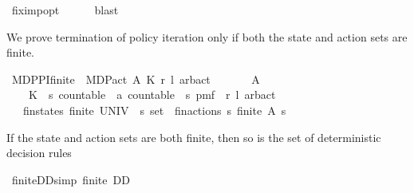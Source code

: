 \begin{isabellebody}
\ {\isasymL}{\isacharunderscore}{\kern0pt}fix{\isacharunderscore}{\kern0pt}imp{\isacharunderscore}{\kern0pt}opt\isanewline
\ \ \ \ \isamarkupfalse%
\ blast\isanewline
{}\isamarkupfalse%
%
\endisatagproof
{\isafoldproof}%
%
\isadelimproof
\isanewline
%
\endisadelimproof
\isanewline
{}\isamarkupfalse%
%
\begin{isamarkuptext}%
We prove termination of policy iteration only if both the state and action sets are finite.%
\end{isamarkuptext}\isamarkuptrue%
\isamarkupfalse%
\ MDP{\isacharunderscore}{\kern0pt}PI{\isacharunderscore}{\kern0pt}finite\ {\isacharequal}{\kern0pt}\ MDP{\isacharunderscore}{\kern0pt}act\ A\ K\ r\ l\ arb{\isacharunderscore}{\kern0pt}act\isanewline
\ \ \isanewline
\ \ \ \ A\ \isanewline
\ \ \ \ K\ {\isacharcolon}{\kern0pt}{\isacharcolon}{\kern0pt}\ {\isachardoublequoteopen}{\isacharprime}{\kern0pt}s\ {\isacharcolon}{\kern0pt}{\isacharcolon}{\kern0pt}countable\ {\isasymtimes}\ {\isacharprime}{\kern0pt}a\ {\isacharcolon}{\kern0pt}{\isacharcolon}{\kern0pt}countable\ {\isasymRightarrow}\ {\isacharprime}{\kern0pt}s\ pmf{\isachardoublequoteclose}\ \ r\ l\ arb{\isacharunderscore}{\kern0pt}act\ {\isacharplus}{\kern0pt}\isanewline
\ \ \ fin{\isacharunderscore}{\kern0pt}states{\isacharcolon}{\kern0pt}\ {\isachardoublequoteopen}finite\ {\isacharparenleft}{\kern0pt}UNIV\ {\isacharcolon}{\kern0pt}{\isacharcolon}{\kern0pt}\ {\isacharprime}{\kern0pt}s\ set{\isacharparenright}{\kern0pt}{\isachardoublequoteclose}\ \ fin{\isacharunderscore}{\kern0pt}actions{\isacharcolon}{\kern0pt}\ {\isachardoublequoteopen}{\isasymAnd}s{\isachardot}{\kern0pt}\ finite\ {\isacharparenleft}{\kern0pt}A\ s{\isacharparenright}{\kern0pt}{\isachardoublequoteclose}\isanewline
{}%
\begin{isamarkuptext}%
If the state and action sets are both finite, 
  then so is the set of deterministic decision rules %
\end{isamarkuptext}\isamarkuptrue%
\isamarkupfalse%
\ finite{\isacharunderscore}{\kern0pt}D\isactrlsub D{\isacharbrackleft}{\kern0pt}simp{\isacharbrackright}{\kern0pt}{\isacharcolon}{\kern0pt}\ {\isachardoublequoteopen}finite\ D\isactrlsub D{\isachardoublequoteclose}\isanewline
%
\isadelimproof
%
\endisadelimproof
%
\isatagproof
{}\isamarkupfalse%
\ {\isacharminus}{\kern0pt}\isanewline
\ \ \isamarkupfalse%

\end{isabellebody}
